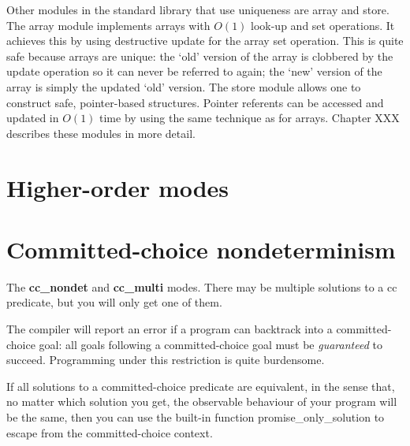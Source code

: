 \documentclass[a4paper,11pt,notitlepage,onecolumn]{book}
\begin{document}
Other modules in the standard library that use uniqueness are \textsf{array} and
\textsf{store}.  The \textsf{array} module implements arrays with $O(1)$ look-up and set
operations.  It achieves this by using destructive update for the array set
operation.  This is quite safe because arrays are unique: the `old' version
of the array is clobbered by the update operation so it can never
be referred to again; the `new' version of the array is simply the updated
`old' version.  The \textsf{store} module allows one to construct safe,
pointer-based structures.  Pointer referents can be accessed and updated in
$O(1)$ time by using the same technique as for arrays.  Chapter XXX
describes these modules in more detail.

\section{Higher-order modes}


\section{Committed-choice nondeterminism}


The \textsf{\textbf{cc\_nondet}} and \textsf{\textbf{cc\_multi}} modes.  There may be multiple solutions to a
cc predicate, but you will only get one of them.

The compiler will report an error if a program can backtrack into a
committed-choice goal: all goals following a committed-choice goal must be
\emph{guaranteed} to succeed.  Programming under this restriction is quite
burdensome.

If all solutions to a committed-choice predicate are equivalent, in the
sense that, no matter which solution you get, the observable behaviour of
your program will be the same, then you can use the built-in function
\textsf{promise\_only\_solution} to escape from the committed-choice context.
\end{document}
